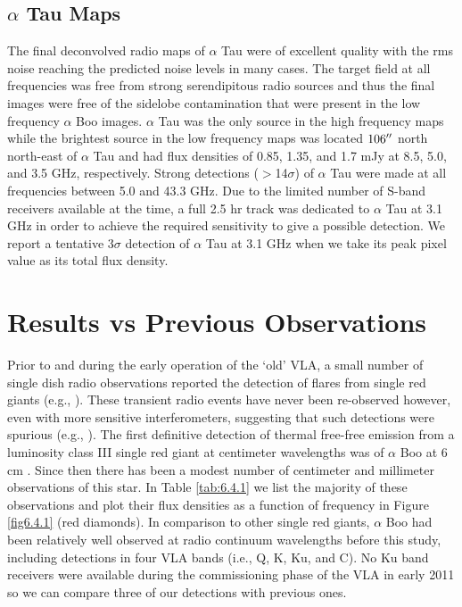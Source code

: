 \subsection{$\alpha$ Tau Maps}\label{sec:6.2.2}
The final deconvolved radio maps of $\alpha$ Tau were of excellent quality with the rms noise reaching the predicted noise levels in many cases. The target field at all frequencies was free from strong serendipitous radio sources and thus the final images were free of the sidelobe contamination that were present in the low frequency $\alpha$ Boo images. $\alpha$ Tau was the only source in the high frequency maps while the brightest source in the low frequency maps was located $106^{\prime\prime}$ north north-east of $\alpha$ Tau and had flux densities of 0.85, 1.35, and 1.7 mJy at 8.5, 5.0, and 3.5 GHz, respectively. Strong detections ($>$14$\sigma$) of $\alpha$ Tau were made at all frequencies between 5.0 and 43.3 GHz. Due to the limited number of S-band receivers available at the time, a full 2.5 hr track was dedicated to $\alpha$ Tau at 3.1 GHz in order to achieve the required sensitivity to give a possible detection. We report a tentative $3\sigma$ detection of $\alpha$ Tau at 3.1 GHz when we take its peak pixel value as its total flux density.

\section{Results vs Previous Observations}\label{sec:6.4}
Prior to and during the early operation of the `old' VLA, a small number of single dish radio observations reported the detection of flares from single red giants (e.g., \citealt{slee_1989}). These transient radio events have never been re-observed however, even with more sensitive interferometers, suggesting that such detections were spurious (e.g., \citealt{beasley_1992}). The first definitive detection of thermal free-free emission from a luminosity class III single red giant at centimeter wavelengths was of $\alpha$ Boo at 6 cm \citep{drake_1983,drake_1986}. Since then there has been a modest number of centimeter and millimeter observations of this star. In Table \ref{tab:6.4.1} we list the majority of these observations and plot their flux densities as a function of frequency in Figure \ref{fig6.4.1} (red diamonds). In comparison to other single red giants, $\alpha$ Boo had been relatively well observed at radio continuum wavelengths before this study, including detections in four VLA bands (i.e., Q, K, Ku, and C). No Ku band receivers were available during the commissioning phase of the VLA in early 2011 so we can compare three of our detections with previous ones.

